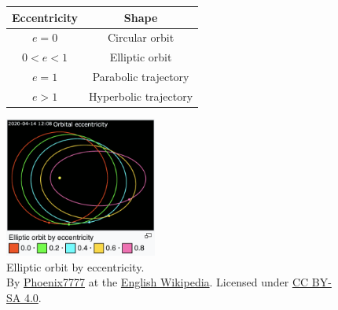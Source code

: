 \documentclass{article}
\begin{document}
\begin{figure}[htp]
    \centering
    \begin{minipage}{0.5\textwidth}
        \begin{center}
        \begin{tabular}{ |c|c| } 
        \hline
        Eccentricity & Shape \\
        \hline
        \hline
        $e = 0$ & Circular orbit \\ 
        $0 < e < 1$ & Elliptic orbit \\ 
        \hline
        $e = 1$ & Parabolic trajectory \\ 
        $e > 1$ & Hyperbolic trajectory \\ 
        \hline
        \end{tabular}
        \end{center}
    \end{minipage}\hfill
    \begin{minipage}{0.5\textwidth}
        \centering
        \includegraphics[width=5cm]{img/eccentricity.png}
        \caption{Elliptic orbit by eccentricity. \\ {\small By \href{https://commons.wikimedia.org/wiki/User:Phoenix7777}{Phoenix7777} at the \href{https://en.wikipedia.org/wiki/}{English Wikipedia}. Licensed under \href{https://creativecommons.org/licenses/by-sa/4.0/}{CC BY-SA 4.0}.}}
    \end{minipage}
\end{figure}
\end{document}
